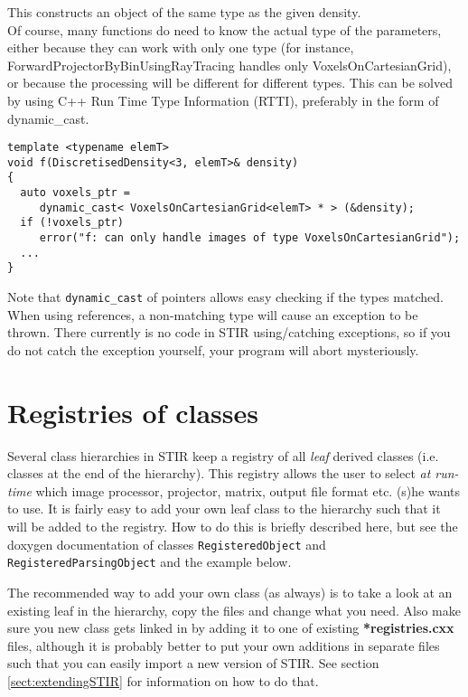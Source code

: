 \documentclass{article}
\begin{document}
This constructs an object of the same type as the given density.\\
Of course, many functions do need to know the actual type of 
the parameters, either because they can work with only one type 
(for instance, ForwardProjectorByBinUsingRayTracing handles only 
VoxelsOnCartesianGrid), or because the processing will be different 
for different types. This can be solved by using C++ Run Time 
Type Information (RTTI), preferably in the form of dynamic\_cast.

\begin{verbatim}
template <typename elemT> 
void f(DiscretisedDensity<3, elemT>& density)
{
  auto voxels_ptr =
     dynamic_cast< VoxelsOnCartesianGrid<elemT> * > (&density);
  if (!voxels_ptr)
     error("f: can only handle images of type VoxelsOnCartesianGrid");
  ...
}
\end{verbatim}


Note that \texttt{dynamic\_cast} of pointers allows easy checking if the 
types matched. When using references, a non-matching type will 
cause an exception to be thrown. There currently is no code in 
STIR using/catching exceptions, so if you do not catch the exception 
yourself, your program will abort mysteriously.


\section{
Registries of classes \label{sect:registries}}

Several class hierarchies in STIR keep a registry of all \textit{leaf} 
derived classes (i.e. classes at the end of the hierarchy). This 
registry allows the user to select \textit{at run-time} which image 
processor, projector, matrix, output file format etc. (s)he 
wants to use. It is fairly easy to add your own leaf class to 
the hierarchy such that it will be added to the registry. How 
to do this is briefly described here, but see the doxygen 
documentation of classes \texttt{RegisteredObject} and \texttt{RegisteredParsingObject}
and the example below. 

The recommended way to add your own class (as always) is to take 
a look at an existing leaf in the hierarchy, copy the files and 
change what you need. Also make sure you new class gets linked 
in by adding it to one of existing \textbf{*registries.cxx} files, although
it is probably better to put your own additions in separate files
such that you can easily import a new version of STIR. 
See section \ref{sect:extendingSTIR} for information on how to do that.
\end{document}
